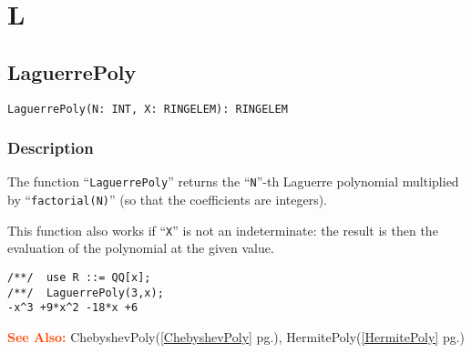 \documentclass[a4paper]{mybook}
\newenvironment{command}{}{} %
\newcommand\SeeAlso{\par\textcolor{OrangeRed}{\textbf{\large See Also: }}}
\begin{document}
\chapter{L}  %
\label{L}

\section{LaguerrePoly}
\label{LaguerrePoly}
\begin{command} %


\begin{Verbatim}[label=syntax, rulecolor=\color{MidnightBlue},
frame=single]
LaguerrePoly(N: INT, X: RINGELEM): RINGELEM
\end{Verbatim}


\subsection*{Description}

The function ``\verb&LaguerrePoly&'' returns the ``\verb&N&''-th Laguerre polynomial
multiplied by ``\verb&factorial(N)&'' (so that the coefficients are integers).
\par 
This function also works if ``\verb&X&'' is not an indeterminate: the result
is then the evaluation of the polynomial at the given value.
\begin{Verbatim}[label=example, rulecolor=\color{PineGreen}, frame=single]
/**/  use R ::= QQ[x];
/**/  LaguerrePoly(3,x);
-x^3 +9*x^2 -18*x +6
\end{Verbatim}


\SeeAlso %
  ChebyshevPoly(\ref{ChebyshevPoly} pg.\pageref{ChebyshevPoly}), 
    HermitePoly(\ref{HermitePoly} pg.\pageref{HermitePoly})
\end{command} %
\end{document}
